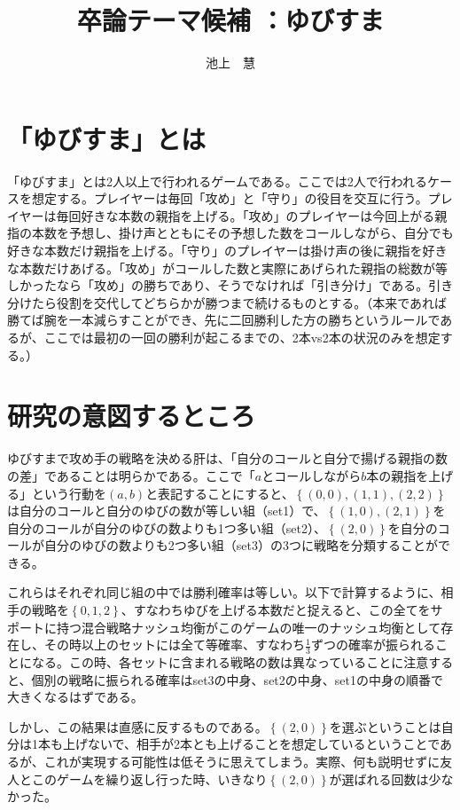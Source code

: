 \documentclass{jsarticle}
\begin{document}
\title{卒論テーマ候補 ：ゆびすま}
\author{池上　慧}
\maketitle

\section{「ゆびすま」とは}
「ゆびすま」とは2人以上で行われるゲームである。ここでは2人で行われるケースを想定する。プレイヤーは毎回「攻め」と「守り」の役目を交互に行う。プレイヤーは毎回好きな本数の親指を上げる。「攻め」のプレイヤーは今回上がる親指の本数を予想し、掛け声とともにその予想した数をコールしながら、自分でも好きな本数だけ親指を上げる。「守り」のプレイヤーは掛け声の後に親指を好きな本数だけあげる。「攻め」がコールした数と実際にあげられた親指の総数が等しかったなら「攻め」の勝ちであり、そうでなければ「引き分け」である。引き分けたら役割を交代してどちらかが勝つまで続けるものとする。（本来であれば勝てば腕を一本減らすことができ、先に二回勝利した方の勝ちというルールであるが、ここでは最初の一回の勝利が起こるまでの、2本vs2本の状況のみを想定する。）

\section{研究の意図するところ}
ゆびすまで攻め手の戦略を決める肝は、「自分のコールと自分で揚げる親指の数の差」であることは明らかである。ここで「$a$とコールしながら$b$本の親指を上げる」という行動を$(a,b)$と表記することにすると、$\left\{ (0,0), (1,1), (2,2)\right\}$は自分のコールと自分のゆびの数が等しい組（set1）で、$\left\{ (1,0), (2,1)\right\}$を自分のコールが自分のゆびの数よりも1つ多い組（set2）、$\left\{ (2,0)\right\}$を自分のコールが自分のゆびの数よりも2つ多い組（set3）の3つに戦略を分類することができる。

これらはそれぞれ同じ組の中では勝利確率は等しい。以下で計算するように、相手の戦略を$\left\{ 0,1,2\right\}$、すなわちゆびを上げる本数だと捉えると、この全てをサポートに持つ混合戦略ナッシュ均衡がこのゲームの唯一のナッシュ均衡として存在し、その時以上のセットには全て等確率、すなわち$\frac{1}{3}$ずつの確率が振られることになる。この時、各セットに含まれる戦略の数は異なっていることに注意すると、個別の戦略に振られる確率はset3の中身、set2の中身、set1の中身の順番で大きくなるはずである。

しかし、この結果は直感に反するものである。$\left\{ (2,0)\right\}$を選ぶということは自分は1本も上げないで、相手が2本とも上げることを想定しているということであるが、これが実現する可能性は低そうに思えてしまう。実際、何も説明せずに友人とこのゲームを繰り返し行った時、いきなり$\left\{ (2,0)\right\}$が選ばれる回数は少なかった。
\end{document}
